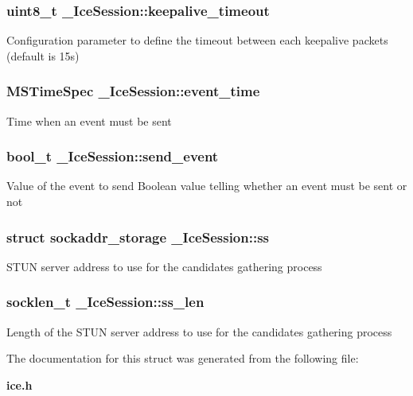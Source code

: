 \subsubsection[{keepalive\-\_\-timeout}]{\setlength{\rightskip}{0pt plus 5cm}uint8\-\_\-t \-\_\-\-Ice\-Session\-::keepalive\-\_\-timeout}\label{struct__IceSession_a1f9e3ba5eda2de70f14d53c2e5afa628}
Configuration parameter to define the timeout between each keepalive packets (default is 15s) 
\subsubsection[{event\-\_\-time}]{\setlength{\rightskip}{0pt plus 5cm}M\-S\-Time\-Spec \-\_\-\-Ice\-Session\-::event\-\_\-time}\label{struct__IceSession_a83c3a06f6e91361a29cb20bf4376659e}
Time when an event must be sent 
\subsubsection[{send\-\_\-event}]{\setlength{\rightskip}{0pt plus 5cm}bool\-\_\-t \-\_\-\-Ice\-Session\-::send\-\_\-event}\label{struct__IceSession_a661d4e8eacfbc74145b2a78a8a3122f4}
Value of the event to send Boolean value telling whether an event must be sent or not 
\subsubsection[{ss}]{\setlength{\rightskip}{0pt plus 5cm}struct sockaddr\-\_\-storage \-\_\-\-Ice\-Session\-::ss}\label{struct__IceSession_a7e08a3862b6b10fed3c0230f1ea17e7e}
S\-T\-U\-N server address to use for the candidates gathering process 
\subsubsection[{ss\-\_\-len}]{\setlength{\rightskip}{0pt plus 5cm}socklen\-\_\-t \-\_\-\-Ice\-Session\-::ss\-\_\-len}\label{struct__IceSession_af5a3e2cca8b877033aecf8c26b4ba088}
Length of the S\-T\-U\-N server address to use for the candidates gathering process 

The documentation for this struct was generated from the following file\-:\begin{DoxyCompactItemize}
\item 
{\bf ice.\-h}\end{DoxyCompactItemize}

